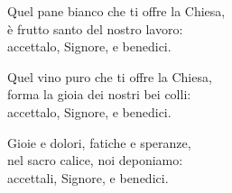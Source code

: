 

\spazio

\strofa Quel pane bianco che ti offre la Chiesa,\\
è frutto santo del nostro lavoro:\\
accettalo, Signore, e benedici.

\spazio


\spazio

\strofa Quel vino puro che ti offre la Chiesa,\\
forma la gioia dei nostri bei colli:\\
accettalo, Signore, e benedici.

\spazio


\spazio

\strofa Gioie e dolori, fatiche e speranze,\\
nel sacro calice, noi deponiamo:\\
accettali, Signore, e benedici.

\spazio

